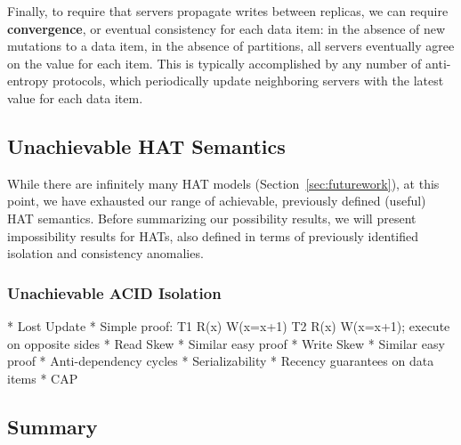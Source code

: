 Finally, to require that servers propagate writes between replicas, we
can require \textbf{convergence}, or eventual consistency for each
data item: in the absence of new mutations to a data item, in the
absence of partitions, all servers eventually agree on the value for
each item. This is typically accomplished by any number of
anti-entropy protocols, which periodically update neighboring servers
with the latest value for each data item.

\subsection{Unachievable HAT Semantics}
\label{sec:unachievable-hat}

While there are infinitely many HAT models
(Section~\ref{sec:futurework}), at this point, we have exhausted our
range of achievable, previously defined (useful) HAT semantics. Before
summarizing our possibility results, we will present impossibility
results for HATs, also defined in terms of previously identified isolation and consistency anomalies.

\subsubsection{Unachievable ACID Isolation}

* Lost Update
	* Simple proof: T1 R(x) W(x=x+1) T2 R(x) W(x=x+1); execute on opposite sides 
* Read Skew
	* Similar easy proof
* Write Skew
	* Similar easy proof
* Anti-dependency cycles
	* Serializability
* Recency guarantees on data items
	* CAP



\subsection{Summary}
\label{sec:hat-summary}

 \newcommand{\lostupdate}{$^\dagger$}
 \newcommand{\rwskew}{$^\ddagger$}
 \newcommand{\mphantom}{$^\star$}
 \newcommand{\linearizable}{$^\oplus$}

